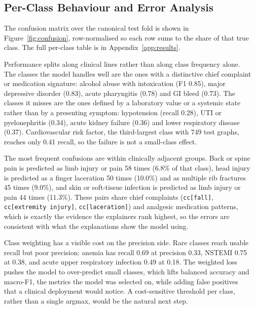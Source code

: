 
\subsection{Per-Class Behaviour and Error Analysis}
\label{sec:error-analysis}

The confusion matrix over the canonical test fold is shown in
Figure~\ref{fig:confusion}, row-normalised so each row sums to the share of that
true class. The full per-class table is in Appendix~\ref{app:results}.

Performance splits along clinical lines rather than along class frequency alone.
The classes the model handles well are the ones with a distinctive chief
complaint or medication signature: alcohol abuse with intoxication (F1 0.85),
major depressive disorder (0.83), acute pharyngitis (0.78) and GI bleed (0.73).
The classes it misses are the ones defined by a laboratory value or a systemic
state rather than by a presenting symptom: hypotension (recall 0.28), UTI or
pyelonephritis (0.34), acute kidney failure (0.36) and lower respiratory disease
(0.37). Cardiovascular risk factor, the third-largest class with 749 test
graphs, reaches only 0.41 recall, so the failure is not a small-class effect.

The most frequent confusions are within clinically adjacent groups. Back or
spine pain is predicted as limb injury or pain 58 times (6.8\% of that class),
head injury is predicted as a finger laceration 50 times (10.0\%) and as
multiple rib fractures 45 times (9.0\%), and skin or soft-tissue infection is
predicted as limb injury or pain 44 times (11.3\%). These pairs share chief
complaints (\texttt{cc[fall]}, \texttt{cc[extremity injury]},
\texttt{cc[laceration]}) and analgesic medication patterns, which is exactly the
evidence the explainers rank highest, so the errors are consistent with what the
explanations show the model using.

Class weighting has a visible cost on the precision side. Rare classes reach
usable recall but poor precision: anemia has recall 0.69 at precision 0.33,
NSTEMI 0.75 at 0.38, and acute upper respiratory infection 0.49 at 0.18. The
weighted loss pushes the model to over-predict small classes, which lifts
balanced accuracy and macro-F1, the metrics the model was selected on, while
adding false positives that a clinical deployment would notice. A cost-sensitive
threshold per class, rather than a single argmax, would be the natural next step.

